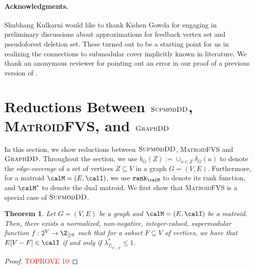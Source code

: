 \documentclass{article}
\newtheorem{remark}{Remark}[section]
\newtheorem{theorem}{Theorem}[section]
\newcommand{\matroidrank}{\ensuremath{\texttt{rank}}\xspace}
\newcommand{\mfvs}{\textsc{MatroidFVS}\xspace}
\newcommand{\densitydeletionset}{\textsc{GraphDD}\xspace}
\newcommand{\dds}{\ensuremath{\textsc{GraphDD}}\xspace}
\newcommand{\sdds}{\ensuremath{\textsc{SupmodDD}}\xspace}
\newcommand{\setcover}{\textsc{SetCover}\xspace}
\begin{document}
\iffalse
\begin{remark}
    Since we have a bicriteria approximation algorithm for \densitydeletionset by \Cref{thm:orientation-LP-bicriteria}, it is natural to wonder whether the bicriteria approximation would imply anything interesting for \setcover via the reduction of  \Cref{thm:DDS-logn-hard}. Unfortunately, our reduction is brittle from the viewpoint of bicriteria approximations---the densest subgraph of the \densitydeletionset instance constructed via the reduction is already very close to the target density in the reduction. Consequently, the empty set would be a valid bicriteria approximate solution which gives us no information about the set cover instance.
\end{remark}
\fi 

\paragraph{Acknowledgments.}
 Shubhang Kulkarni would like to thank Kishen Gowda for engaging in preliminary discussions about approximations for feedback vertex set and pseudoforest deletion set. These turned out to be a starting point for us in realizing the connections to submodular cover implicitly known in literature. We thank an anonymous reviewer for pointing out an error in our proof of a previous version of  .
 




\appendix
\section{Reductions Between \sdds, \mfvs, and \dds}\label{appendix:sec:reductions}

In this section, we show reductions between \sdds, \mfvs and \dds. Throughout the section, we use $b_{G}(Z) := \cup_{u \in Z}\delta_G(u)$ to denote the \emph{edge-coverage} of  a set of vertices $Z \subseteq V$ in a graph $G = (V, E)$. Furthermore, for a matroid $\calM = (E, \calI)$, we use $\matroidrank_{\calM}$ to denote its rank function, and $\calM^*$ to denote the dual matroid. We first show that \mfvs is a special case of \sdds.
\begin{theorem}\label{thm:matroidfvs-to-supmodDD}
    Let $G = (V, E)$ be a graph and $\calM = (E, \calI)$ be a matroid. Then, there exists a normalized, non-negative, integer-valued, supermodular function $f:2^V\rightarrow\Z_{\geq 0}$ such that for a subset $F\subseteq V$ of vertices, we have that $E[V - F] \in \calI$ if and only if $\lambda^*_{f|_{V - F}}\leq 1$.
\end{theorem}
\begin{proof}\textcolor{red}{TOPROVE 10}\end{proof}
\end{document}
